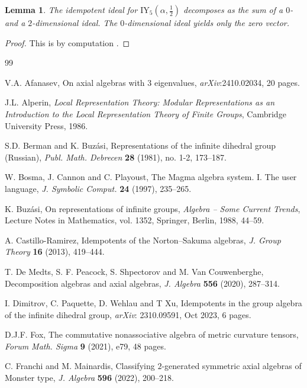 \documentclass[11pt, a4paper]{article}
\theoremstyle{plain}
\newtheorem{lemma}[theorem]{Lemma}
\theoremstyle{definition}
\newcommand\al{\alpha}
\newcommand{\IY}{\mathrm{IY}}
\newcommand{\0}{\overline{0}}
\newcommand{\2}{\overline{2}}
\newcommand{\1}{\mathbbm{1}}
\begin{document}
\begin{lemma}
The idempotent ideal for $\IY_5(\al, \frac{1}{2})$ decomposes as the sum of a $0$- and a $2$-dimensional ideal.  The $0$-dimensional ideal yields only the zero vector.
\end{lemma}
\begin{proof}
This is by computation \cite[\texttt{Xinf.m}]{githubcode}.
\end{proof}


\begin{thebibliography}{99}

 V.A. Afanasev, On axial algebras with $3$ eigenvalues, \textit{arXiv}:2410.02034, 20 pages.

 J.L. Alperin, \textit{Local Representation Theory: Modular Representations as an Introduction to the Local Representation Theory of Finite Groups}, Cambridge University Press, 1986.

 S.D. Berman and K. Buz\'asi, Representations of the infinite dihedral group (Russian), \textit{Publ. Math. Debrecen} {\bf 28} (1981), no. 1-2, 173--187.

 W. Bosma, J. Cannon and C. Playoust, The Magma algebra system. I. The user language, \textit{J. Symbolic Comput.} {\bf 24} (1997), 235--265.

 K. Buz\'asi, On representations of infinite groups, \textit{Algebra -- Some Current Trends}, Lecture Notes in Mathematics, vol. 1352, Springer, Berlin, 1988, 44--59.

 A. Castillo-Ramirez, Idempotents of the Norton–Sakuma algebras, \textit{J. Group Theory} {\bf 16} (2013), 419--444.

 T. De Medts, S. F. Peacock, S. Shpectorov and M. Van Couwenberghe, Decomposition algebras and axial algebras, \textit{J. Algebra} {\bf 556} (2020), 287--314.

 I. Dimitrov, C. Paquette, D. Wehlau and T Xu, Idempotents in the group algebra of the infinite dihedral group, \textit{arXiv}: 2310.09591, Oct 2023, 6 pages.

 D.J.F. Fox, The commutative nonassociative algebra of metric curvature tensors, \textit{Forum Math. Sigma} {\bf 9} (2021), e79, 48 pages.

 C. Franchi and M. Mainardis, Classifying $2$-generated symmetric axial algebras of Monster type, \textit{J. Algebra} {\bf 596} (2022), 200--218.


\end{thebibliography}
\end{document}
